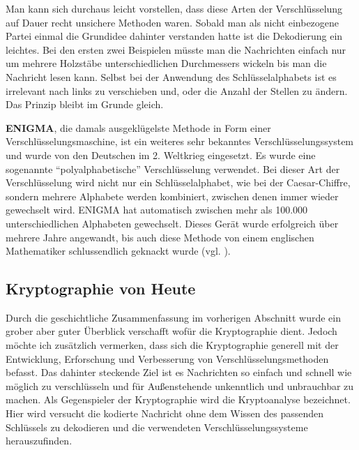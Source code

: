 \documentclass[12pt,a4paper]{article}
\theoremstyle{definition}
\begin{document}
Man kann sich durchaus leicht vorstellen, dass diese Arten der Verschlüsselung auf Dauer recht unsichere Methoden waren.
Sobald man als nicht einbezogene Partei einmal die Grundidee dahinter verstanden hatte ist die Dekodierung ein leichtes.
Bei den ersten zwei Beispielen müsste man die Nachrichten einfach nur um mehrere Holzstäbe unterschiedlichen Durchmessers wickeln bis man die Nachricht lesen kann.
Selbst bei der Anwendung des Schlüsselalphabets ist es irrelevant nach links zu verschieben und, oder die Anzahl der Stellen zu ändern.
Das Prinzip bleibt im Grunde gleich.

\textbf{ENIGMA}, die damals ausgeklügelste Methode in Form einer Verschlüsselungsmaschine, ist ein weiteres sehr bekanntes Verschlüsselungssystem und wurde von den Deutschen im 2. Weltkrieg eingesetzt.
Es wurde eine sogenannte “polyalphabetische” Verschlüsselung verwendet.
Bei dieser Art der Verschlüsselung wird nicht nur ein Schlüsselalphabet, wie bei der Caesar-Chiffre, sondern mehrere Alphabete werden kombiniert, zwischen denen immer wieder gewechselt wird.
ENIGMA hat automatisch zwischen mehr als 100.000 unterschiedlichen Alphabeten gewechselt.
Dieses Gerät wurde erfolgreich über mehrere Jahre angewandt, bis auch diese Methode von einem englischen Mathematiker schlussendlich geknackt wurde (vgl. \cite[103--105]{RempeGillen2009}).

\subsection{Kryptographie von Heute}\label{Kryptographie von Heute}
Durch die geschichtliche Zusammenfassung im vorherigen Abschnitt wurde ein grober aber guter Überblick verschafft wofür die Kryptographie dient.
Jedoch möchte ich zusätzlich vermerken, dass sich die Kryptographie generell mit der Entwicklung, Erforschung und Verbesserung von Verschlüsselungsmethoden befasst.
Das dahinter steckende Ziel ist es Nachrichten so einfach und schnell wie möglich zu verschlüsseln und für Außenstehende unkenntlich und unbrauchbar zu machen.
Als Gegenspieler der Kryptographie wird die Kryptoanalyse bezeichnet.
Hier wird versucht die kodierte Nachricht ohne dem Wissen des passenden Schlüssels zu dekodieren und die verwendeten Verschlüsselungssysteme herauszufinden.
\end{document}
